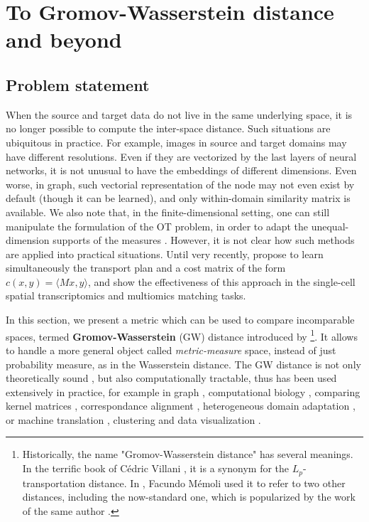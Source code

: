 \section{To Gromov-Wasserstein distance and beyond} \label{sec:gw}

\subsection{Problem statement}

When the source and target data do not live in the same underlying space, it is no longer possible
to compute the inter-space distance. Such situations are ubiquitous in practice.
For example, images in source and target domains may have different resolutions. Even if they
are vectorized by the last layers of neural networks, it is not unusual to have the
embeddings of different dimensions. Even worse, in graph,
such vectorial representation of the node may not even exist by default
(though it can be learned), and only within-domain similarity matrix is available.
We also note that, in the finite-dimensional setting,
one can still manipulate the formulation of the OT problem,
in order to adapt the unequal-dimension supports of the measures \citep{Cai22,McCann20}.
However, it is not clear how such methods are applied into practical situations.
Until very recently, \citep{Sebbouh23} propose to learn simultaneously the transport plan and
a cost matrix of the form $c(x, y) = \langle M x, y \rangle$, and show the effectiveness
of this approach in the single-cell spatial transcriptomics and multiomics matching tasks.

In this section, we present a metric which can be used to compare incomparable spaces,
termed \textbf{Gromov-Wasserstein} (GW) distance introduced by \citep{Memoli07,Memoli11}
\footnote{Historically, the name "Gromov-Wasserstein distance" has several meanings.
In the terrific book of Cédric Villani \citep{Villani08}, it is a synonym
for the $L_p$-transportation distance. In \citep{Memoli11b},
Facundo Mémoli used it to refer to two other distances, including the now-standard one, which is
popularized by the work of the same author \citep{Memoli11}.}. It allows to handle a more general
object called \textit{metric-measure} space, instead of just probability measure, as in
the Wasserstein distance. The GW distance is not only theoretically sound \citep{Memoli11,Sturm12},
but also computationally tractable, thus has been used extensively in practice,
for example in graph \citep{Vayer19b,Xu19,Xu19b,Chowdhury20,Vincent21},
computational biology \citep{Demetci20}, comparing kernel matrices \citep{Peyre16},
correspondance alignment \citep{Solomon16}, heterogeneous domain adaptation \citep{Yan18},
or machine translation \citep{Melis18}, clustering and data visualization \citep{Ryner22}.


